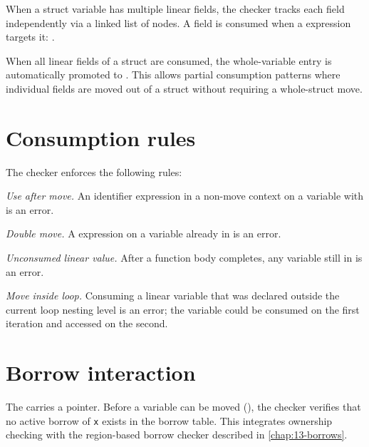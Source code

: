 \pnum
When a struct variable has multiple linear fields, the checker tracks each
field independently via a linked list of  nodes.  A field
is consumed when a  expression targets it:
.

\pnum
When all linear fields of a struct are consumed, the whole-variable entry is
automatically promoted to .  This allows partial
consumption patterns where individual fields are moved out of a struct without
requiring a whole-struct move.

\section{Consumption rules}
\label{sec:lin-rules}

\pnum
The checker enforces the following rules:

\begin{description}[leftmargin=2.5cm, style=nextline]
\item[\diagcode{E001}] \textit{Use after move.}  An identifier expression in a
  non-move context on a variable with  is an error.
\item[\diagcode{E002}] \textit{Double move.}  A  expression on a
  variable already in  is an error.
\item[\diagcode{E003}] \textit{Unconsumed linear value.}  After a function body
  completes, any  variable still in 
  is an error.
\item[\diagcode{E006}] \textit{Move inside loop.}  Consuming a linear variable
  that was declared outside the current loop nesting level is an error; the
  variable could be consumed on the first iteration and accessed on the second.
\end{description}

\section{Borrow interaction}
\label{sec:lin-borrows}

\pnum
The  carries a  pointer.  Before a
variable can be moved (), the checker verifies that no active borrow
of \texttt{x} exists in the borrow table.  This integrates ownership checking
with the region-based borrow checker described in \cref{chap:13-borrows}.

